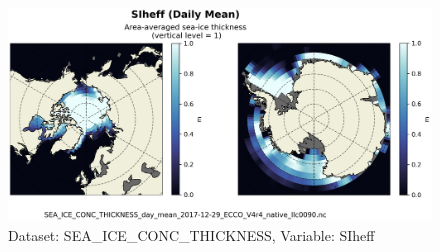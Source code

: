 \begin{figure}[H]
\centering
\includegraphics[scale=0.55]{../images/plots/native_plots/Sea-Ice_and_Snow_Concentration_and_Thickness/SIheff.png}
\caption{Dataset: SEA\_ICE\_CONC\_THICKNESS, Variable: SIheff}
\label{tab:table-SEA_ICE_CONC_THICKNESS_SIheff-Plot}
\end{figure}
\newpage
\pagebreak
